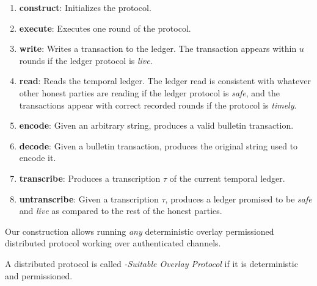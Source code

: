 \begin{enumerate}
  \item \textbf{construct}: Initializes the protocol.
  \item \textbf{execute}: Executes one round of the protocol.
  \item \textbf{write}: Writes a transaction to the ledger. The transaction
        appears within $u$ rounds if the ledger protocol is \emph{live}.
  \item \textbf{read}: Reads the temporal ledger. The ledger read is
        consistent with whatever other honest parties are reading if the
        ledger protocol is \emph{safe}, and the transactions appear with
        correct recorded rounds if the protocol is \emph{timely}.
  \item \textbf{encode}: Given an arbitrary string, produces a valid bulletin transaction.
  \item \textbf{decode}: Given a bulletin transaction, produces the original
        string used to encode it.
  \item \textbf{transcribe}: Produces a transcription $\tau$ of the
        current temporal ledger.
  \item \textbf{untranscribe}: Given a transcription $\tau$, produces a ledger
        promised to be \emph{safe} and \emph{live} as compared to the
        rest of the honest parties.
\end{enumerate}


Our construction allows running \emph{any} deterministic
overlay permissioned distributed protocol
working over authenticated channels.

\begin{definition}
  A distributed protocol is called \emph{\rollerblade-Suitable Overlay Protocol}
  if it is deterministic and permissioned.
\end{definition}


